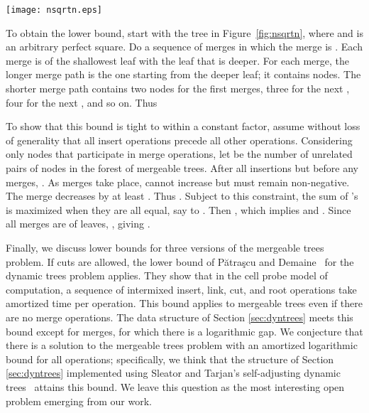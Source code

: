 \documentclass[twoside,leqno,twocolumn]{article}
\begin{document}
\begin{figure*}
\addtolength{\abovecaptionskip}{-.5cm}
\begin{center}
\resizebox{0.30\textwidth}{!} {\texttt{[image: nsqrtn.eps]}}
\end{center}
\caption{\label{fig:nsqrtn}
Initial tree for a sequence of merges whose shorter merge paths have  nodes.  The  merge is of the shallowest leaf and the leaf that is  deeper.}
\end{figure*}

To obtain the lower bound, start with the tree in Figure~\ref{fig:nsqrtn}, where  and  is an arbitrary perfect square.  Do a sequence of  merges in which the  merge is .  Each merge is of the shallowest leaf with the leaf that is  deeper.  For each merge, the longer merge path is the one starting from the deeper leaf; it contains  nodes.  The shorter merge path contains two nodes for the first  merges, three for the next , four for the next , and so on.  Thus
\vspace{-.1cm}


To show that this bound is tight to within a constant factor, assume without loss of generality that all insert operations precede all other operations.  Considering only nodes that participate in merge operations, let  be the number of unrelated pairs of nodes in the forest of mergeable trees.  After all insertions but before any merges, .  As merges take place,  cannot increase but must remain non-negative.  The  merge decreases  by at least .  Thus .  Subject to this constraint, the sum of 's is maximized when they are all equal, say to .  Then , which implies  and .  Since all merges are of leaves, , giving .


Finally, we discuss lower bounds for three versions of the mergeable trees problem.  If cuts are allowed, the lower bound of P\u{a}tra\c{s}cu and Demaine~\cite{loglb:pd06} for the dynamic trees problem applies.  They show that in the cell probe model of computation, a sequence of intermixed insert, link, cut, and root operations take  amortized time per operation.  This bound applies to mergeable trees even if there are no merge operations.  The data structure of Section \ref{sec:dyntrees} meets this bound except for merges, for which there is a logarithmic gap.  We conjecture that there is a solution to the mergeable trees problem with an amortized logarithmic bound for all operations; specifically, we think that the structure of Section \ref{sec:dyntrees} implemented using Sleator and Tarjan's self-adjusting dynamic trees~\cite{ST85} attains this bound.  We leave this question as the most interesting open problem emerging from our work.
\end{document}
